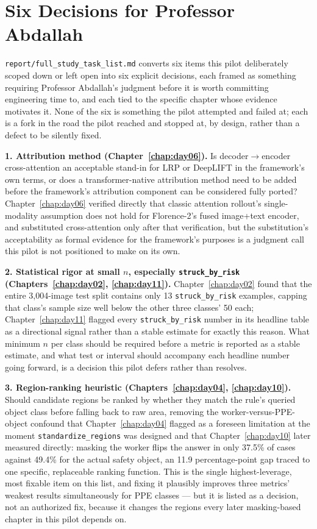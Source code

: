 \section{Six Decisions for Professor Abdallah}
\label{sec:day14-decisions}

\texttt{report/full\_study\_task\_list.md} converts six items this pilot deliberately scoped
down or left open into six explicit decisions, each framed as something requiring Professor
Abdallah's judgment before it is worth committing engineering time to, and each tied to the
specific chapter whose evidence motivates it. None of the six is something the pilot attempted
and failed at; each is a fork in the road the pilot reached and stopped at, by design, rather
than a defect to be silently fixed.

\textbf{1. Attribution method (Chapter~\ref{chap:day06}).} Is decoder$\to$encoder
cross-attention an acceptable stand-in for LRP or DeepLIFT in the framework's own terms, or does
a transformer-native attribution method need to be added before the framework's attribution
component can be considered fully ported? Chapter~\ref{chap:day06} verified directly that
classic attention rollout's single-modality assumption does not hold for Florence-2's fused
image+text encoder, and substituted cross-attention only after that verification, but the
substitution's acceptability as formal evidence for the framework's purposes is a judgment call
this pilot is not positioned to make on its own.

\textbf{2. Statistical rigor at small $n$, especially \texttt{struck\_by\_risk}
(Chapters~\ref{chap:day02}, \ref{chap:day11}).} Chapter~\ref{chap:day02} found that the entire
3,004-image test split contains only 13 \texttt{struck\_by\_risk} examples, capping that class's
sample size well below the other three classes' 50 each; Chapter~\ref{chap:day11} flagged every
\texttt{struck\_by\_risk} number in its headline table as a directional signal rather than a
stable estimate for exactly this reason. What minimum $n$ per class should be required before a
metric is reported as a stable estimate, and what test or interval should accompany each
headline number going forward, is a decision this pilot defers rather than resolves.

\textbf{3. Region-ranking heuristic (Chapters~\ref{chap:day04}, \ref{chap:day10}).} Should
candidate regions be ranked by whether they match the rule's queried object class before
falling back to raw area, removing the worker-versus-PPE-object confound that
Chapter~\ref{chap:day04} flagged as a foreseen limitation at the moment
\texttt{standardize\_regions} was designed and that Chapter~\ref{chap:day10} later measured
directly: masking the worker flips the answer in only 37.5\% of cases against 49.4\% for the
actual safety object, an 11.9 percentage-point gap traced to one specific, replaceable ranking
function. This is the single highest-leverage, most fixable item on this list, and fixing it
plausibly improves three metrics' weakest results simultaneously for PPE classes --- but it is
listed as a decision, not an authorized fix, because it changes the regions every later
masking-based chapter in this pilot depends on.


